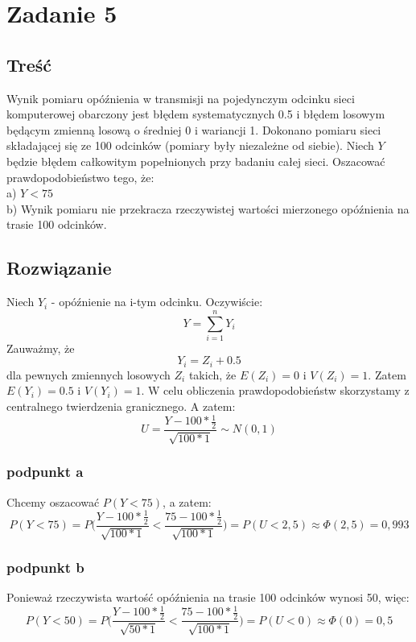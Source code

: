 \documentclass[10pt, a4paper]{article}
\begin{document}
\section*{Zadanie 5}
\subsection*{Treść}
Wynik pomiaru opóźnienia w transmisji na pojedynczym odcinku sieci
komputerowej obarczony jest błędem systematycznych 0.5 i błędem losowym będącym zmienną losową o średniej 0 i wariancji 1. Dokonano pomiaru sieci składającej się ze 100 odcinków (pomiary były niezależne od siebie). Niech $Y$ będzie błędem całkowitym popełnionych przy badaniu całej sieci. Oszacować prawdopodobieństwo tego, że: \\
a) $Y < 75$ \\
b) Wynik pomiaru nie przekracza rzeczywistej wartości mierzonego opóźnienia na trasie 100 odcinków. \\
\subsection*{Rozwiązanie}
Niech $Y_i$ - opóźnienie na i-tym odcinku. Oczywiście:
\begin{equation}
Y=\sum_{i=1}^n Y_i
\end{equation} 
Zauważmy, że 
\begin{equation}
Y_i = Z_i + 0.5
\end{equation}
dla pewnych zmiennych losowych $Z_i$ takich, że $E(Z_i) = 0$ i $V(Z_i) = 1$. Zatem $E(Y_i) = 0.5$ i $V(Y_i)=1$. W celu obliczenia prawdopodobieństw skorzystamy z centralnego twierdzenia granicznego. A zatem:
\begin{equation}
U=\frac{Y - 100 *\frac{1}{2}}{\sqrt{100 * 1}} \sim N(0, 1)
\end{equation}
\subsubsection*{podpunkt a}
Chcemy oszacować $P(Y < 75)$, a zatem:
\begin{equation}
P(Y < 75) = P \Big(\frac{Y - 100 *\frac{1}{2}}{\sqrt{100 * 1}} < \frac{75 - 100 *\frac{1}{2}}{\sqrt{100 * 1}}\Big) = P (U < 2,5) \approx \Phi(2,5) = 0,993
\end{equation}
\subsubsection*{podpunkt b}
Ponieważ rzeczywista wartość opóźnienia na trasie 100 odcinków wynosi 50, więc:
\begin{equation}
P(Y < 50) = P \Big(\frac{Y - 100 *\frac{1}{2}}{\sqrt{50 * 1}} < \frac{75 - 100 *\frac{1}{2}}{\sqrt{100 * 1}}\Big) = P (U < 0) \approx \Phi(0) = 0,5
\end{equation}
\end{document}
